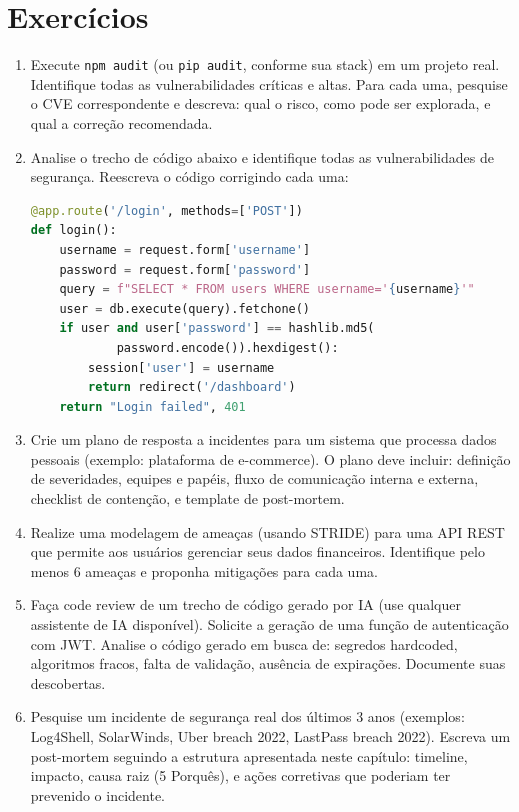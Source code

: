 \section*{Exercícios}

\begin{enumerate}
    \item Execute \texttt{npm audit} (ou \texttt{pip audit}, conforme sua stack)
    em um projeto real. Identifique todas as vulnerabilidades críticas e altas.
    Para cada uma, pesquise o CVE correspondente e descreva: qual o risco, como
    pode ser explorada, e qual a correção recomendada.

    \item Analise o trecho de código abaixo e identifique todas as vulnerabilidades
    de segurança. Reescreva o código corrigindo cada uma:
    \begin{lstlisting}[language=Python]
@app.route('/login', methods=['POST'])
def login():
    username = request.form['username']
    password = request.form['password']
    query = f"SELECT * FROM users WHERE username='{username}'"
    user = db.execute(query).fetchone()
    if user and user['password'] == hashlib.md5(
            password.encode()).hexdigest():
        session['user'] = username
        return redirect('/dashboard')
    return "Login failed", 401
    \end{lstlisting}

    \item Crie um plano de resposta a incidentes para um sistema que processa dados
    pessoais (exemplo: plataforma de e-commerce). O plano deve incluir: definição de
    severidades, equipes e papéis, fluxo de comunicação interna e externa, checklist
    de contenção, e template de post-mortem.

    \item Realize uma modelagem de ameaças (usando STRIDE) para uma API REST que
    permite aos usuários gerenciar seus dados financeiros. Identifique pelo menos
    6 ameaças e proponha mitigações para cada uma.

    \item Faça code review de um trecho de código gerado por IA (use qualquer
    assistente de IA disponível). Solicite a geração de uma função de autenticação
    com JWT. Analise o código gerado em busca de: segredos hardcoded, algoritmos
    fracos, falta de validação, ausência de expirações. Documente suas descobertas.

    \item Pesquise um incidente de segurança real dos últimos 3 anos (exemplos:
    Log4Shell, SolarWinds, Uber breach 2022, LastPass breach 2022). Escreva um
    post-mortem seguindo a estrutura apresentada neste capítulo: timeline, impacto,
    causa raiz (5 Porquês), e ações corretivas que poderiam ter prevenido o
    incidente.
\end{enumerate}

